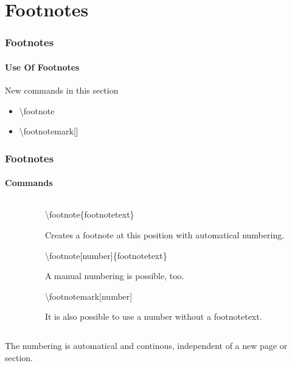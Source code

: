 \section{Footnotes}

\begin{frame}
\frametitle{Footnotes}
\framesubtitle{Use Of Footnotes}
\begin{block}{New commands in this section}
\begin{itemize}
\item \color{nounibaredI}\textbackslash footnote
\item \textbackslash footnotemark\color{nounibagreenI}[]\color{black}
\end{itemize}
\end{block}
\end{frame}


\begin{frame}
\frametitle{Footnotes}
\framesubtitle{Commands}
\begin{columns}
\begin{column}{0.5\textwidth}
\begin{ttfamily}\scriptsize

\end{ttfamily}
\end{column}
\begin{column}{0.5\textwidth}
\begin{ttfamily}\color{nounibaredI}\textbackslash footnote\color{black}\{footnotetext\}\end{ttfamily} Creates a footnote at this position with
automatical numbering.

\begin{ttfamily}\color{nounibaredI}\textbackslash footnote\color{nounibagreenI}[number]\color{black}\{footnotetext\}\end{ttfamily} A manual
numbering is possible, too.

\begin{ttfamily}\color{nounibaredI}\textbackslash footnotemark\color{nounibagreenI}[number]\color{black}\end{ttfamily}
It is also possible to use a number without a footnotetext.
\end{column}
\end{columns}
\bigskip
The numbering is automatical and continous, independent of 
a new page or {\ttfamily section}.
\end{frame}